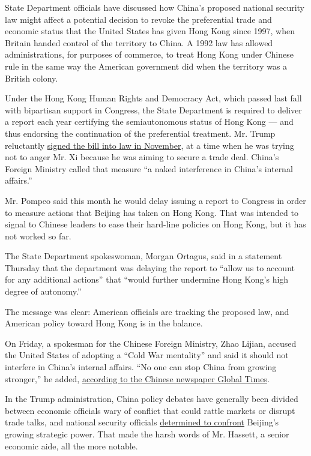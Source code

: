 State Department officials have discussed how China's proposed national
security law might affect a potential decision to revoke the
preferential trade and economic status that the United States has given
Hong Kong since 1997, when Britain handed control of the territory to
China. A 1992 law has allowed administrations, for purposes of commerce,
to treat Hong Kong under Chinese rule in the same way the American
government did when the territory was a British colony.

Under the Hong Kong Human Rights and Democracy Act, which passed last
fall with bipartisan support in Congress, the State Department is
required to deliver a report each year certifying the semiautonomous
status of Hong Kong --- and thus endorsing the continuation of the
preferential treatment. Mr. Trump reluctantly
\href{https://www.nytimes3xbfgragh.onion/2019/11/27/us/politics/trump-hong-kong.html}{signed
the bill into law in November}, at a time when he was trying not to
anger Mr. Xi because he was aiming to secure a trade deal. China's
Foreign Ministry called that measure ``a naked interference in China's
internal affairs.''

Mr. Pompeo said this month he would delay issuing a report to Congress
in order to measure actions that Beijing has taken on Hong Kong. That
was intended to signal to Chinese leaders to ease their hard-line
policies on Hong Kong, but it has not worked so far.

The State Department spokeswoman, Morgan Ortagus, said in a statement
Thursday that the department was delaying the report to ``allow us to
account for any additional actions'' that ``would further undermine Hong
Kong's high degree of autonomy.''

The message was clear: American officials are tracking the proposed law,
and American policy toward Hong Kong is in the balance.

On Friday, a spokesman for the Chinese Foreign Ministry, Zhao Lijian,
accused the United States of adopting a ``Cold War mentality'' and said
it should not interfere in China's internal affairs. ``No one can stop
China from growing stronger,'' he added,
\href{https://www.globaltimes.cn/content/1189178.shtml}{according to the
Chinese newspaper Global Times}.

In the Trump administration, China policy debates have generally been
divided between economic officials wary of conflict that could rattle
markets or disrupt trade talks, and national security officials
\href{https://www.nytimes3xbfgragh.onion/2020/05/01/us/politics/coronavirus-china-trump.html}{determined
to confront} Beijing's growing strategic power. That made the harsh
words of Mr. Hassett, a senior economic aide, all the more notable.

